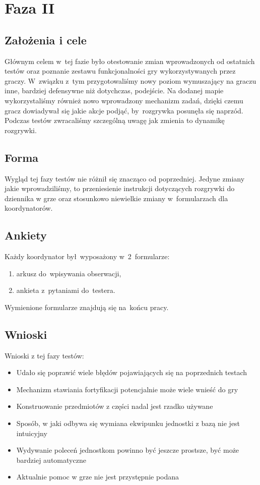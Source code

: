 \documentclass[licencjacka]{pracamgr}
\begin{document}
    \section{Faza II}

      \subsection{Założenia i cele}
      Głównym celem w~tej fazie było otestowanie zmian wprowadzonych od ostatnich testów oraz poznanie zestawu funkcjonalności gry
      wykorzystywanych przez graczy. W~związku z~tym przygotowaliśmy nowy poziom wymuszający na graczu inne, bardziej defensywne
      niż dotychczas, podejście. Na dodanej mapie wykorzystaliśmy również nowo wprowadzony mechanizm zadań, dzięki czemu gracz
      dowiadywał się jakie akcje podjąć, by~rozgrywka posunęła się naprzód. Podczas testów zwracaliśmy szczególną uwagę jak zmienia
      to dynamikę rozgrywki.

      \subsection{Forma}
      Wygląd tej fazy testów nie różnił się znacząco od poprzedniej. Jedyne zmiany jakie wprowadziliśmy,
      to przeniesienie instrukcji dotyczących rozgrywki do dziennika w grze oraz stosunkowo niewielkie zmiany
      w~formularzach dla koordynatorów.

      \subsection{Ankiety}
      Każdy koordynator był~wyposażony w~2~formularze:
      \begin{enumerate}
	\item arkusz do~wpisywania obserwacji,
	\item ankieta z~pytaniami do~testera.
      \end{enumerate}

      \noindent
      Wymienione formularze znajdują się na~końcu pracy.

      \subsection{Wnioski}
      Wnioski z tej fazy testów:
      \begin{itemize}
       \item Udało się poprawić wiele błędów pojawiających się na poprzednich testach
       \item Mechanizm stawiania fortyfikacji potencjalnie może wiele wnieść do gry
       \item Konstruowanie przedmiotów z części nadal jest rzadko używane
       \item Sposób, w jaki odbywa się wymiana ekwipunku jednostki z bazą nie jest intuicyjny
       \item Wydywanie poleceń jednostkom powinno być jeszcze prostsze, być może bardziej automatyczne
       \item Aktualnie pomoc w grze nie jest przystępnie podana
      \end{itemize}
\end{document}
